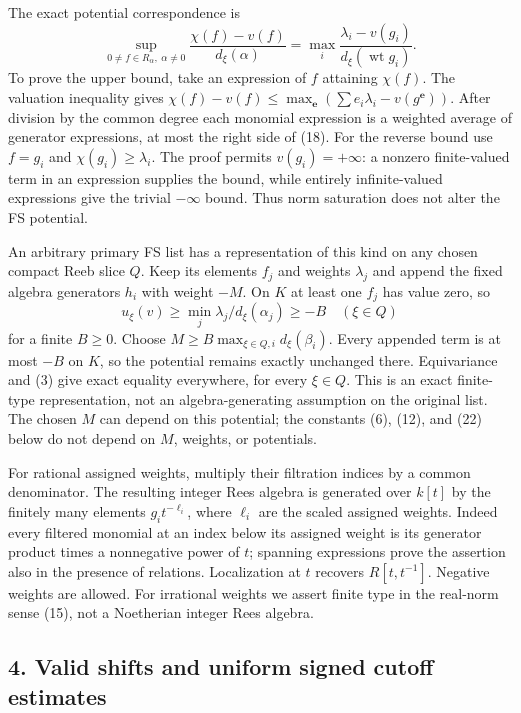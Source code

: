 \documentclass[
  11pt,
]{article}
\begin{document}
The exact potential correspondence is \[
 \sup_{0\ne f\in R_\alpha,\ \alpha\ne0}
 \frac{\chi(f)-v(f)}{d_\xi(\alpha)}
 =\max_i\frac{\lambda_i-v(g_i)}{d_\xi(\operatorname{wt}g_i)}.
 \tag{18}
\] To prove the upper bound, take an expression of \(f\) attaining
\(\chi(f)\). The valuation inequality gives
\(\chi(f)-v(f)\leq\max_{\mathbf e}(\sum e_i\lambda_i-v(g^{\mathbf e}))\).
After division by the common degree each monomial expression is a
weighted average of generator expressions, at most the right side of
(18). For the reverse bound use \(f=g_i\) and
\(\chi(g_i)\geq\lambda_i\). The proof permits \(v(g_i)=+\infty\): a
nonzero finite-valued term in an expression supplies the bound, while
entirely infinite-valued expressions give the trivial \(-\infty\) bound.
Thus norm saturation does not alter the FS potential.

An arbitrary primary FS list has a representation of this kind on any
chosen compact Reeb slice \(Q\). Keep its elements \(f_j\) and weights
\(\lambda_j\) and append the fixed algebra generators \(h_i\) with
weight \(-M\). On \(K\) at least one \(f_j\) has value zero, so \[
 u_\xi(v)\geq\min_j\lambda_j/d_\xi(\alpha_j)\geq-B
 \quad(\xi\in Q)
\] for a finite \(B\geq0\). Choose
\(M\geq B\max_{\xi\in Q,i}d_\xi(\beta_i)\). Every appended term is at
most \(-B\) on \(K\), so the potential remains exactly unchanged there.
Equivariance and (3) give exact equality everywhere, for every
\(\xi\in Q\). This is an exact finite-type representation, not an
algebra-generating assumption on the original list. The chosen \(M\) can
depend on this potential; the constants (6), (12), and (22) below do not
depend on \(M\), weights, or potentials.

For rational assigned weights, multiply their filtration indices by a
common denominator. The resulting integer Rees algebra is generated over
\(k[t]\) by the finitely many elements \(g_i t^{-\ell_i}\), where
\(\ell_i\) are the scaled assigned weights. Indeed every filtered
monomial at an index below its assigned weight is its generator product
times a nonnegative power of \(t\); spanning expressions prove the
assertion also in the presence of relations. Localization at \(t\)
recovers \(R[t,t^{-1}]\). Negative weights are allowed. For irrational
weights we assert finite type in the real-norm sense (15), not a
Noetherian integer Rees algebra.

\subsection{4. Valid shifts and uniform signed cutoff
estimates}\label{valid-shifts-and-uniform-signed-cutoff-estimates}
\end{document}
